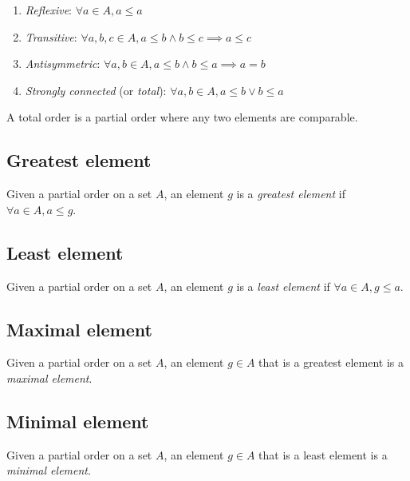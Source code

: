 \documentclass[a4paper]{article}
\begin{document}
\begin{enumerate}
    \item \textit{Reflexive}: \(\forall a \in A, a \leq a\)
    \item \textit{Transitive}: \(\forall a,b,c \in A, a \leq b \land b \leq c \implies a \leq c\)
    \item \textit{Antisymmetric}: \(\forall a,b \in A, a \leq b \land b \leq a \implies a=b\)
    \item \textit{Strongly connected} (or \textit{total}): \(\forall a,b\in A, a \leq b \lor b\leq a\)
\end{enumerate}

A total order is a partial order where any two elements are comparable.

\subsection{Greatest element}

Given a partial order on a set \(A\), an element \(g\) is a \textit{greatest element}
if \(\forall a\in A, a \leq g\).

\subsection{Least element}

Given a partial order on a set \(A\), an element \(g\) is a \textit{least element}
if \(\forall a\in A, g \leq a\).

\subsection{Maximal element}

Given a partial order on a set \(A\), an element \(g\in A\) that is
a greatest element is a \textit{maximal element}.

\subsection{Minimal element}

Given a partial order on a set \(A\), an element \(g\in A\) that is
a least element is a \textit{minimal element}.

\pagebreak
\end{document}
